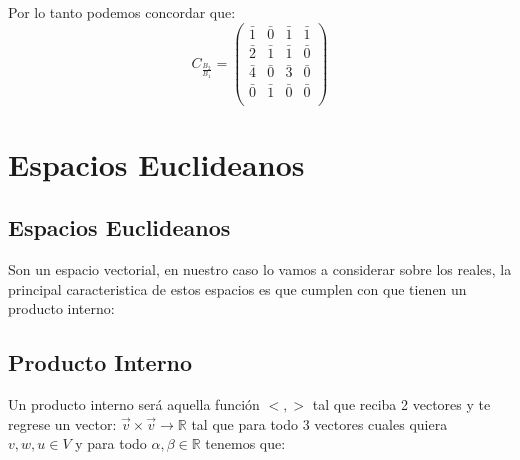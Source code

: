 \documentclass[12pt]{report}							    %
\begin{document}
        Por lo tanto podemos concordar que:
        \begin{equation*}
            C_{\frac{B_2}{B_1}} = 
            \begin{pmatrix}
                \bar{1} & \bar{0} & \bar{1} & \bar{1} \\
                \bar{2} & \bar{1} & \bar{1} & \bar{0} \\
                \bar{4} & \bar{0} & \bar{3} & \bar{0} \\
                \bar{0} & \bar{1} & \bar{0} & \bar{0} \\
            \end{pmatrix}
        \end{equation*}



\chapter{Espacios Euclideanos}
    \clearpage

    \section{Espacios Euclideanos}
        Son un espacio vectorial, en nuestro caso lo vamos a considerar sobre los reales, la principal caracteristica de estos espacios es que cumplen con que tienen un producto interno:


    \clearpage
    \section{Producto Interno}
        Un producto interno será aquella función $<,>$ tal que reciba 2 vectores y
        te regrese un vector: $\vec v \times \vec v \to \mathbb{R}$ tal que para
        todo 3 vectores cuales quiera $v, w, u \in V$ y para todo
        $\alpha , \beta \in  \mathbb{R} $ tenemos que:
\end{document}
